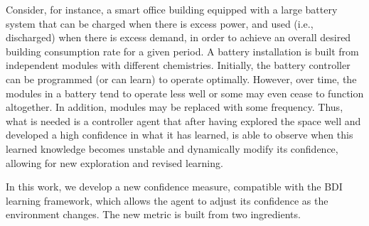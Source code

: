 Consider, for instance, a smart office building equipped with a large battery system that can be charged when there is excess power, and used (i.e., discharged) when there is excess demand, in order to achieve an overall desired building consumption rate for a given period. A battery installation is built from independent modules with different chemistries. Initially, the battery controller can be programmed (or can learn) to operate optimally. However, over time, the modules in a battery tend to operate less well or some may even cease to function altogether. In addition, modules may be replaced with some frequency.  
Thus, what is needed is a controller agent that after having explored the space well and developed a high confidence in what it has learned, is able to observe when this learned knowledge becomes unstable and dynamically modify its confidence, allowing for new exploration and revised learning.




In this work, we develop a new confidence measure, compatible with the BDI learning framework, which allows the agent to adjust its confidence as the environment changes.
The new metric is built from two ingredients. 

